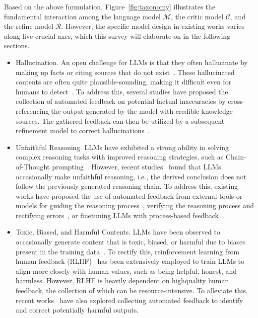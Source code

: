 \documentclass[12pt]{extarticle}
\begin{document}
Based on the above formulation, Figure~\ref{fig:taxonomy} illustrates the fundamental interaction among the language model $\mathcal{M}$, the critic model $\mathcal{C}$, and the refine model $\mathcal{R}$. However, the specific model design in existing works varies along five crucial axes, which this survey will elaborate on in the following sections.

\begin{itemize}
    \item Hallucination. An open challenge for LLMs is that they often hallucinate by making up facts or citing sources that do not exist~\cite{li2023halueval, zhang2023language}. These hallucinated contents are often quite plausible-sounding, making it difficult even for humans to detect~\cite{clark2021thats}. To address this, several studies have proposed the collection of automated feedback on potential factual inaccuracies by cross-referencing the output generated by the model with credible knowledge sources. The gathered feedback can then be utilized by a subsequent refinement model to correct hallucinations~\cite{gao2023rarr, zhang2023language}.

    \item Unfaithful Reasoning. LLMs have exhibited a strong ability in solving complex reasoning tasks with improved reasoning strategies, such as Chain-of-Thought prompting~\cite{wei2023chainofthought}. However, recent studies~\cite{golovneva2023roscoe,ribeiro2023street,lyu2023faithful} found that LLMs occasionally make unfaithful reasoning, i.e., the derived conclusion does not follow the previously generated reasoning chain. To address this, existing works have proposed the use of automated feedback from external tools or models for guiding the reasoning process~\cite{xie2023selfevaluation, yao2023tree}, verifying the reasoning process and rectifying errors~\cite{he2022rethinking,pan2023logiclm}, or finetuning LLMs with process-based feedback~\cite{huang2022large, lightman2023lets}.

    \item Toxic, Biased, and Harmful Contents. LLMs have been observed to occasionally generate content that is toxic, biased, or harmful due to biases present in the training data~\cite{shaikh-etal-2023-second}. To rectify this, reinforcement learning from human feedback (RLHF)~\cite{ouyang2022training, bai2022training} has been extensively employed to train LLMs to align more closely with human values, such as being helpful, honest, and harmless. However, RLHF is heavily dependent on highquality human feedback, the collection of which can be resource-intensive. To alleviate this, recent works~\cite{lu2022quark, gou2023critic} have also explored collecting automated feedback to identify and correct potentially harmful outputs.


\end{itemize}
\end{document}
